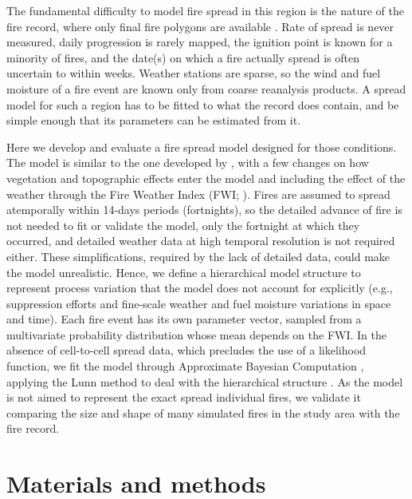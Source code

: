 \documentclass[ResearchPaper,linenum]{CSIRO_LaTeX_Template}
\begin{document}
The fundamental difficulty to model fire spread in this region is the nature of the 
fire record, where only final fire polygons are available \citep{morales_stochastic_2015}. 
Rate of spread is never measured, daily progression is rarely mapped, 
the ignition point is known for a minority of fires, 
and the date(s) on which a fire actually spread is often
uncertain to within weeks. Weather stations are sparse, so the wind and fuel moisture of
a fire event are known only from coarse reanalysis products. A spread model
for such a region has to be fitted to what the record does contain, and be simple
enough that its parameters can be estimated from it.

Here we develop and evaluate a fire spread model designed for those conditions. 
The model is similar to the one developed by \citet{morales_stochastic_2015},
with a few changes on how vegetation and topographic effects enter the model
and including the effect of the weather through the Fire Weather Index 
(FWI; \citealt{van_wagner_development_1987}). Fires are assumed to spread 
atemporally within 14-days periods (fortnights), so the detailed advance 
of fire is not needed to fit or validate the model, only the fortnight at which they
occurred, and detailed weather data at high temporal resolution is not
required either. These simplifications, required by the lack of detailed data,
could make the model unrealistic. Hence, we define a hierarchical model structure 
to represent process variation that the model does not account for explicitly 
(e.g., suppression efforts and fine-scale weather and fuel moisture variations 
in space and time).
Each fire event has its own parameter vector, sampled from a multivariate 
probability distribution whose mean depends on the FWI. 
In the absence of cell-to-cell spread data, which precludes the use of a likelihood
function, we fit the model through Approximate Bayesian Computation
\citep{beaumont2010approximate, morales_stochastic_2015}, 
applying the Lunn method to deal with the hierarchical structure 
\citep{lunn2013fully}. As the model is not aimed to represent the exact spread 
individual fires, we validate it comparing the size and shape of many simulated
fires in the study area with the fire record.

\section{Materials and methods}

\end{document}
